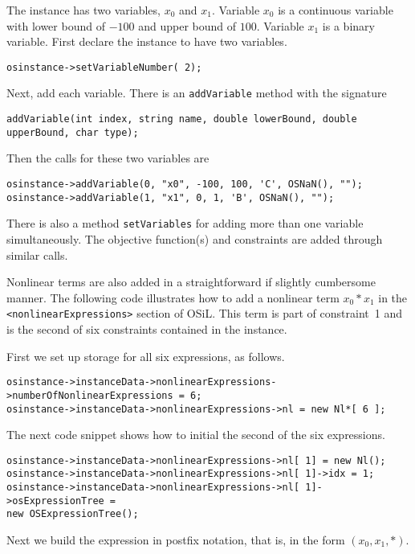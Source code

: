 \documentclass[11pt]{article}
\renewcommand{\{}{{\char"7B}}
\renewcommand{\}}{{\char"7D}}
\renewcommand{\^}{{\char"0D}}
\renewcommand{\'}{{\char"0D}}
\begin{document}
The instance has two variables, $x_{0}$ and $x_{1}$. Variable $x_{0}$ is a continuous variable with lower bound of $-100$ and upper bound of $100$. Variable $x_{1}$ is a binary variable. First declare the instance to have two variables.
\begin{verbatim}
osinstance->setVariableNumber( 2);
\end{verbatim}
Next, add each variable. There is an {\tt addVariable} method with the signature
\begin{verbatim}
addVariable(int index, string name, double lowerBound, double upperBound, char type);
\end{verbatim}
Then the calls for these two variables are
\begin{verbatim}
osinstance->addVariable(0, "x0", -100, 100, 'C', OSNaN(), "");
osinstance->addVariable(1, "x1", 0, 1, 'B', OSNaN(), "");
\end{verbatim}
There is also a method {\tt setVariables} for adding more than one variable simultaneously.  The objective function(s) 
and constraints are added through similar calls.

Nonlinear terms are also added in a straightforward if slightly cumbersome manner.   
The following code illustrates how to add a nonlinear term $x_{0}*x_{1}$ in the 
{\tt <nonlinearExpressions>} section of  OSiL. This term is part of constraint~1
and is the second of six constraints contained in the instance. 

First we set up storage for all six expressions, as follows.

\begin{verbatim}
osinstance->instanceData->nonlinearExpressions->numberOfNonlinearExpressions = 6;
osinstance->instanceData->nonlinearExpressions->nl = new Nl*[ 6 ];
\end{verbatim}

The next code snippet shows how to initial the second of the six expressions.

\begin{verbatim}
osinstance->instanceData->nonlinearExpressions->nl[ 1] = new Nl();
osinstance->instanceData->nonlinearExpressions->nl[ 1]->idx = 1;
osinstance->instanceData->nonlinearExpressions->nl[ 1]->osExpressionTree =
new OSExpressionTree();
\end{verbatim}

Next we build the expression in postfix notation, that is, in the form $(x_0, x_1, *)$.
\end{document}
